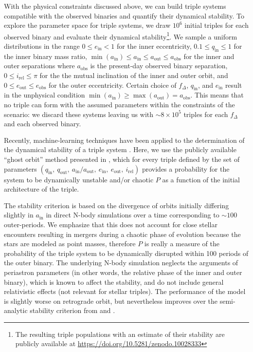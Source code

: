 \documentclass{aa}
\begin{document}
 With the physical constraints discussed above, we can build triple
 systems compatible with the observed binaries and
 quantify their dynamical stability. To explore the
 parameter space for triple systems, we draw $10^6$ initial triples for each
 observed binary and
 evaluate their dynamical stability\footnote{The resulting triple
   populations with an estimate of their stability are
 publicly available at \url{https://doi.org/10.5281/zenodo.10028333}}.
 We sample a uniform distributions in the range $0\leq e_\mathrm{in}<1$ for the
 inner eccentricity, $0.1\leq q_\mathrm{in}\leq 1$ for the inner
 binary mass ratio,
 $\min(a_\mathrm{in})\leq a_\mathrm{in}\leq a_\mathrm{out}\leq a_\mathrm{obs}$
 for the inner and outer separations where $a_\mathrm{obs}$ is the
 present-day observed binary separation,
 $0\leq i_\mathrm{rel}\leq \pi$ for the the mutual inclination of the
 inner and outer orbit, and $0\leq e_\mathrm{out}\leq e_\mathrm{obs}$
 for the outer eccentricity. Certain choice of $f_\Delta$,
 $q_\mathrm{in}$, and $e_\mathrm{in}$ result in the unphysical
 condition
 $\min(a_\mathrm{in}) \geq \max(a_\mathrm{out})=a_\mathrm{obs}$. This
 means that no triple can form with the assumed parameters within the
 constraints of the scenario: we discard these systems leaving us with
 $\sim 8\times 10^5$ triples for each $f_\Delta$ and each observed
 binary.

 Recently, machine-learning techniques have been applied to the
 determination of the dynamical stability of a triple system
 \citep[e.g.,][]{lalande:22, vynatheya:22, vynatheya:23}. Here, we use the
 publicly available ``ghost orbit'' method presented in
 \cite{vynatheya:23}, which for every triple defined by the set of
 parameters
 $(q_\mathrm{in},\ q_\mathrm{out},\ a_\mathrm{in}/a_\mathrm{out},\ e_\mathrm{in},\ e_\mathrm{out},\ i_\mathrm{rel})$
 provides a probability for the system to be dynamically unstable
 and/or chaotic $P$ as a function of the initial architecture of the
 triple.

 The stability criterion is based on the divergence of orbits initially
 differing slightly in $a_\mathrm{in}$ in direct N-body simulations
 over a time corresponding to $\sim 100$ outer-periods. We emphasize
 that this does not account for close stellar encounters resulting
 in mergers during a chaotic phase of evolution because the stars are
 modeled as point masses, therefore $P$ is really a measure of the
 probability of the triple system to be dynamically disrupted within
 100 periods of the outer binary. The underlying N-body simulation
 neglects the arguments of periastron parameters (in other words, the
 relative phase of the inner and outer binary), which is known to
 affect the stability, and do not include general relativistic effects
 (not relevant for stellar triples). The performance of the model is
 slightly worse on retrograde orbit, but nevertheless improves over
 the semi-analytic stability criterion from \cite{mardling:99} and
 \cite{vynatheya:22}.
\end{document}
